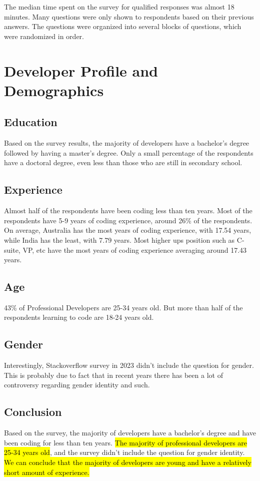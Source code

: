 \documentclass[12pt,titlepage]{article}
\begin{document}
The median time spent on the survey for qualified responses was almost 18 minutes. Many questions
were only shown to respondents based on their previous answers. The questions were organized into
several blocks of questions, which were randomized in order.

\section{Developer Profile and Demographics}

\subsection{Education}
Based on the survey results, the majority of developers have a bachelor's degree followed by having
a master's degree. Only a small percentage of the respondents have a doctoral degree, even less
than those who are still in secondary school.

\subsection{Experience}
Almost half of the respondents have been coding less than ten years. Most of the respondents have
5-9 years of coding experience, around 26\% of the respondents. On average, Australia has the most
years of coding experience, with 17.54 years, while India has the least, with 7.79 years. Most
higher ups position such as C-suite, VP, etc have the most years of coding experience averaging
around 17.43 years.

\subsection{Age}
43\% of Professional Developers are 25-34 years old. But more than half of the respondents
learning to code are 18-24 years old.

\subsection{Gender}
Interestingly, Stackoverflow survey in 2023 didn't include the question for gender.
This is probably due to fact that in recent years there has been a lot of controversy
regarding gender identity and such.

\subsection{Conclusion}
Based on the survey, the majority of developers have a bachelor's degree and have been coding
for less than ten years. \hl{The majority of professional developers are 25-34 years old}, and the
survey didn't include the question for gender identity.  \hl{We can conclude that the majority of
developers are young and have a relatively short amount of experience.}
\end{document}
